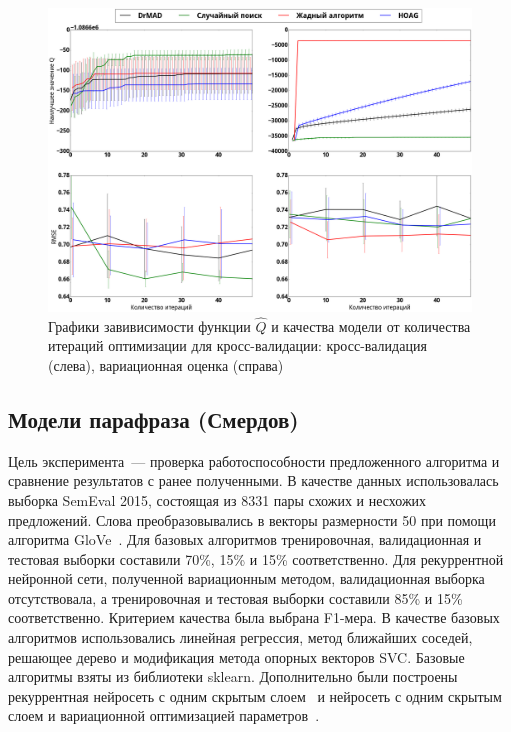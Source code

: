     \begin{figure}

    \includegraphics[width=\linewidth]{plots/hyperparams/wisdm.png}

    \caption{Графики завивисимости функции $\hat{Q}$ и качества модели от количества итераций оптимизации для кросс-валидации:  кросс-валидация (слева), вариационная оценка (справа)}
    \end{figure}



\subsection{Модели парафраза (Смердов)}
Цель эксперимента~--- проверка работоспособности предложенного алгоритма и сравнение результатов с ранее полученными. В качестве данных использовалась выборка SemEval 2015, состоящая из 8331 пары схожих и несхожих предложений. Слова преобразовывались в векторы размерности 50 при помощи алгоритма GloVe~\cite{GloveURL}.
Для базовых алгоритмов тренировочная, валидационная и тестовая выборки составили 70\%, 15\% и 15\% соответственно.
Для рекуррентной нейронной сети, полученной вариационным методом, валидационная выборка отсутствовала, а тренировочная и тестовая выборки составили 85\% и 15\% соответственно.
Критерием качества была выбрана F1-мера.
В качестве базовых алгоритмов использовались линейная регрессия, метод ближайших соседей, решающее дерево и модификация метода опорных векторов SVC. Базовые алгоритмы взяты из библиотеки sklearn. 
Дополнительно были построены рекуррентная нейросеть с одним скрытым слоем~\cite{Sanborn} и нейросеть с одним скрытым слоем и вариационной оптимизацией параметров~\cite{Graves, code}.

